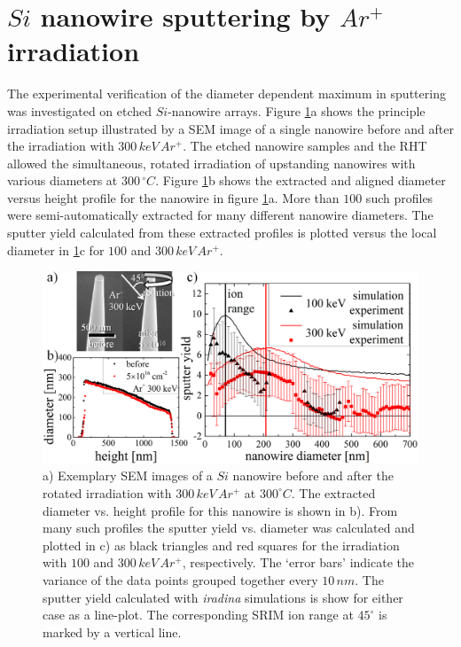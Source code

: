 \section{$Si$ nanowire sputtering by $Ar^+$ irradiation}
\label{sec:sisputtering}

The experimental verification of the diameter dependent maximum in sputtering was investigated on etched $Si$-nanowire arrays. Figure \ref{sputtering_exp}a shows the principle irradiation setup illustrated by a SEM image of a single nanowire before and after the irradiation with $300\,keV\,Ar^+$. The etched nanowire samples and the RHT allowed the simultaneous, rotated irradiation of upstanding nanowires with various diameters at $300\,^\circ C$. Figure \ref{sputtering_exp}b shows the extracted and aligned diameter versus height profile for the nanowire in figure \ref{sputtering_exp}a. More than $100$ such profiles were semi-automatically extracted for many different nanowire diameters. The sputter yield calculated from these extracted profiles is plotted versus the local diameter in \ref{sputtering_exp}c for $100$ and $300\,keV\,Ar^+$.

\begin{figure}[th]
	\centering
		\includegraphics[width=.95\textwidth]{images/sputter_exp.png}
	\caption{a) Exemplary SEM images of a $Si$ nanowire before and after the rotated irradiation with $300\,keV\,Ar^+$ at $300^\circ C$. The extracted diameter vs. height profile for this nanowire is shown in b). From many such profiles the sputter yield vs. diameter was calculated and plotted in c) as black triangles and red squares for the irradiation with $100$ and $300\,keV\,Ar^+$, respectively. The `error bars' indicate the variance of the data points grouped together every $10\,nm$. The sputter yield calculated with \emph{iradina} simulations is show for either case as a line-plot. The corresponding SRIM ion range at $45^\circ$ is marked by a vertical line.} 
	\label{sputtering_exp}
\end{figure} 

